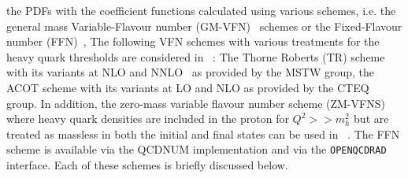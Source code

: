 the PDFs with the coefficient functions calculated using various schemes, i.e.
the general mass Variable-Flavour number (GM-VFN)~\cite{VFN} schemes or the
Fixed-Flavour number (FFN)~\cite{Laenen:1992, Laenen:1993, Riem:1995}, 
%
The following VFN schemes with various treatments for the heavy 
quark thresholds are considered in \fitter\ :
The Thorne Roberts (TR) scheme with its variants at NLO and
NNLO~\cite{Thorne:1997ga,Thorne:2006qt} as provided by the MSTW group,
the ACOT scheme with its variants at LO and NLO as provided by the CTEQ group. 
In addition, the zero-mass variable flavour number scheme (ZM-VFNS) where 
heavy quark densities are included in the proton for $Q^2>>m_h^2$ but are treated 
as massless in both the initial and final states can be used in \fitter\ .
The FFN scheme is available via the QCDNUM implementation and via the 
{\tt OPENQCDRAD}~\cite{openqcdrad:page} interface.
Each of these schemes is briefly discussed below.

